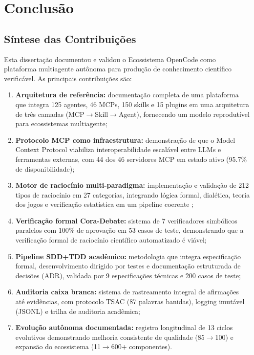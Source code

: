 \documentclass[12pt,a4paper,sumario=tradicional]{abntex2}
\begin{document}
\chapter{Conclusão}

\section{Síntese das Contribuições}

Esta dissertação documentou e validou o Ecossistema OpenCode como plataforma multiagente autônoma para produção de conhecimento científico verificável. As principais contribuições são:

\begin{enumerate}
    \item \textbf{Arquitetura de referência:} documentação completa de uma plataforma que integra 125 agentes, 46 MCPs, 150 skills e 15 plugins em uma arquitetura de três camadas (MCP$\rightarrow$Skill$\rightarrow$Agent), fornecendo um modelo reprodutível para ecossistemas multiagente;
    
    \item \textbf{Protocolo MCP como infraestrutura:} demonstração de que o Model Context Protocol \cite{ayyagari2025mcp} viabiliza interoperabilidade escalável entre LLMs e ferramentas externas, com 44 dos 46 servidores MCP em estado ativo (95.7\% de disponibilidade);
    
    \item \textbf{Motor de raciocínio multi-paradigma:} implementação e validação de 212 tipos de raciocínio em 27 categorias, integrando lógica formal, dialética, teoria dos jogos e verificação estatística em um pipeline coerente \cite{antero2024harnessing};
    
    \item \textbf{Verificação formal Cora-Debate:} sistema de 7 verificadores simbólicos paralelos com 100\% de aprovação em 53 casos de teste, demonstrando que a verificação formal de raciocínio científico automatizado é viável;
    
    \item \textbf{Pipeline SDD+TDD acadêmico:} metodologia que integra especificação formal, desenvolvimento dirigido por testes e documentação estruturada de decisões (ADR), validada por 9 especificações técnicas e 200 casos de teste;
    
    \item \textbf{Auditoria caixa branca:} sistema de rastreamento integral de afirmações até evidências, com protocolo TSAC (87 palavras banidas), logging imutável (JSONL) e trilha de auditoria acadêmica;
    
    \item \textbf{Evolução autônoma documentada:} registro longitudinal de 13 ciclos evolutivos demonstrando melhoria consistente de qualidade (85$\rightarrow$100) e expansão do ecossistema (11$\rightarrow$600+ componentes).
\end{enumerate}
\end{document}

